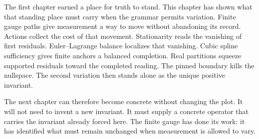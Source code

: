 The first chapter earned a place for truth to stand. This chapter has shown
what that standing place must carry when the grammar permits variation.
Finite gauge paths give measurement a way to move without abandoning its
record. Actions collect the cost of that movement. Stationarity reads the
vanishing of first residuals. Euler--Lagrange balance localizes that
vanishing. Cubic spline sufficiency gives finite anchors a balanced
completion. Real partitions squeeze supported residuals toward the completed
reading. The pinned boundary kills the nullspace. The second variation then
stands alone as the unique positive invariant.

The next chapter can therefore become concrete without changing the plot.
It will not need to invent a new invariant. It must supply a concrete
operator that carries the invariant already forced here. The finite gauge
has done its work: it has identified what must remain unchanged when
measurement is allowed to vary.
